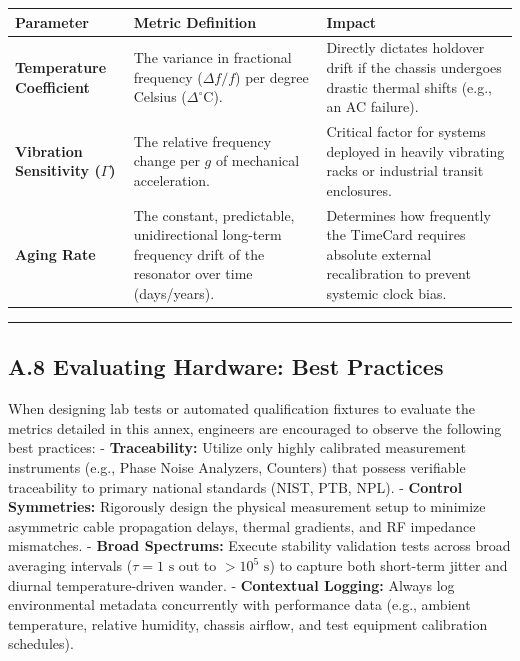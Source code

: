 \documentclass[
]{article}
\newcounter{none} %
\begin{document}
{\def\LTcaptype{none} %
\begin{longtable}[]{@{}
  >{\raggedright\arraybackslash}p{}
  >{\raggedright\arraybackslash}p{}
  >{\raggedright\arraybackslash}p{}@{}}
\toprule\noalign{}
Parameter & Metric Definition & Impact \\
\midrule\noalign{}
\endhead
\bottomrule\noalign{}
\endlastfoot
\textbf{Temperature Coefficient} & The variance in fractional frequency
(\(\Delta f/f\)) per degree Celsius (\(\Delta^\circ\text{C}\)). &
Directly dictates holdover drift if the chassis undergoes drastic
thermal shifts (e.g., an AC failure). \\
\textbf{Vibration Sensitivity (\(\Gamma\))} & The relative frequency
change per \(g\) of mechanical acceleration. & Critical factor for
systems deployed in heavily vibrating racks or industrial transit
enclosures. \\
\textbf{Aging Rate} & The constant, predictable, unidirectional
long-term frequency drift of the resonator over time (days/years). &
Determines how frequently the TimeCard requires absolute external
recalibration to prevent systemic clock bias. \\
\end{longtable}
}

\begin{center}\rule{0.5\linewidth}{0.5pt}\end{center}

\subsection{A.8 Evaluating Hardware: Best
Practices}\label{a.8-evaluating-hardware-best-practices}

When designing lab tests or automated qualification fixtures to evaluate
the metrics detailed in this annex, engineers are encouraged to observe
the following best practices: - \textbf{Traceability:} Utilize only
highly calibrated measurement instruments (e.g., Phase Noise Analyzers,
Counters) that possess verifiable traceability to primary national
standards (NIST, PTB, NPL). - \textbf{Control Symmetries:} Rigorously
design the physical measurement setup to minimize asymmetric cable
propagation delays, thermal gradients, and RF impedance mismatches. -
\textbf{Broad Spectrums:} Execute stability validation tests across
broad averaging intervals (\(\tau = 1\text{ s}\) out to
\(>10^5\text{ s}\)) to capture both short-term jitter and diurnal
temperature-driven wander. - \textbf{Contextual Logging:} Always log
environmental metadata concurrently with performance data (e.g., ambient
temperature, relative humidity, chassis airflow, and test equipment
calibration schedules).
\end{document}
